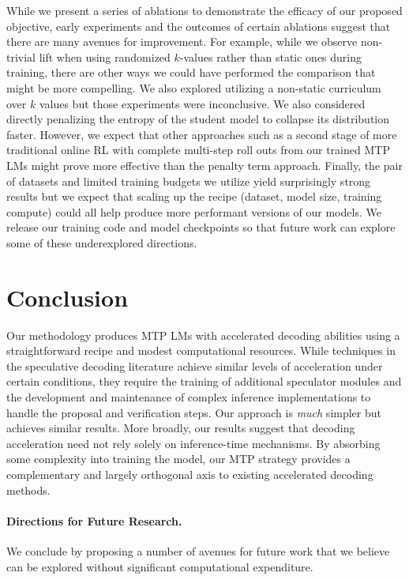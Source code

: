 \documentclass{article}
\theoremstyle{plain}
\theoremstyle{definition}
\theoremstyle{remark}
\begin{document}
While we present a series of ablations to demonstrate the efficacy of our proposed objective, early experiments and the outcomes of certain ablations suggest that there are many avenues for improvement. For example, while we observe non-trivial lift when using randomized $k$-values rather than static ones during training, there are other ways we could have performed the comparison that might be more compelling. We also explored utilizing a non-static curriculum over $k$ values but those experiments were inconclusive. We also considered directly penalizing the entropy of the student model to collapse its distribution faster. However, we expect that other approaches such as a second stage of more traditional online RL with complete multi-step roll outs from our trained MTP LMs might prove more effective than the penalty term approach. Finally, the pair of datasets and limited training budgets we utilize yield surprisingly strong results but we expect that scaling up the recipe (dataset, model size, training compute) could all help produce more performant versions of our models.
We release our training code and model checkpoints so that future work can explore some of these underexplored directions.

\section{Conclusion}\label{sec:conc}

Our methodology produces MTP LMs with accelerated decoding abilities using a straightforward recipe and modest computational resources.
While techniques in the speculative decoding literature achieve similar levels of acceleration under certain conditions, they require the training of additional speculator modules and the development and maintenance of complex inference implementations to handle the proposal and verification steps. Our approach is \textit{much} simpler but achieves similar results.
More broadly, our results suggest that decoding acceleration need not rely solely on inference-time mechanisms. By absorbing some complexity into training the model, our MTP strategy provides a complementary and largely orthogonal axis to existing accelerated decoding methods.

\paragraph{Directions for Future Research.}
We conclude by proposing a number of avenues for future work that we believe can be explored without significant computational expenditure. 
  
\end{document}
